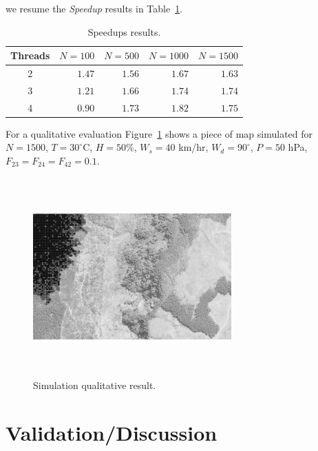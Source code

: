 \documentclass[conference]{IEEEtran}
\begin{document}
    we resume the \emph{Speedup} results in Table~\ref{tab:speedups}.
    
    \begin{table}[!ht]
      \renewcommand{\arraystretch}{1.3}
      \centering
      \caption{Speedups results.}
      \label{tab:speedups}
      \begin{tabular}{c||rrrr}
        \hline
        Threads & $N=100$ & $N=500$ & $N=1000$ & $N=1500$ \\ \hline\hline
        2       & $1.47$ & $1.56$ & $1.67$ & $1.63$ \\
        3       & $1.21$ & $1.66$ & $1.74$ & $1.74$ \\
        4       & $0.90$ & $1.73$ & $1.82$ & $1.75$  
      \end{tabular}
    \end{table}
    
    For a qualitative evaluation Figure~\ref{fig:simulation} shows a piece of map simulated for 
    $N=1500$, $T=30^{\circ}$C, $H=50$\%, $W_s=40$ km/hr, $W_d=90^{\circ}$, $P=50$ hPa, 
    $F_{23} = F_{24}= F_{42} = 0.1$.
    
    \begin{figure}[!ht]
      \centering
      \includegraphics[width=3in,height=3in,clip,keepaspectratio]{figures/simulation_gray.png}
      \caption{Simulation qualitative result.}
      \label{fig:simulation}
    \end{figure}
    

  \section{Validation/Discussion}
    
\end{document}

